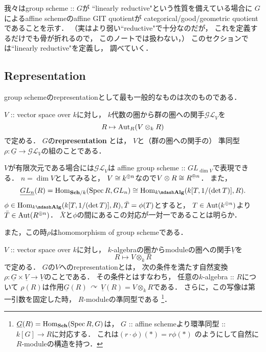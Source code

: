 \documentclass[a4paper]{jsarticle}
\newcommand{\Sch}{\mathbf{Sch}}
\newcommand{\Alg}{\mathbf{Alg}}
\newcommand{\func}[1]{\underline{#1}}
\newcommand{\ftorGL}{\mathcal{GL}}
\newcommand{\acton}{\,\curvearrowright\,}
\newcommand{\GL}{GL}
\begin{document}
    我々はgroup scheme :: $G$が
    ``linearly reductive"という性質を備えている場合に
    $G$によるaffine schemeのaffine GIT quotientが
    categorical/good/geometric quotientであることを示す．
    （実はより弱い``reductive"で十分なのだが，
    これを定義するだけでも骨が折れるので，
    このノートでは扱わない，）
    このセクションでは``linearly reductive"を定義し，
    調べていく．

    \subsection{Representation} 
    group schemeのrepresentationとして最も一般的なものは次のものである．
    \begin{Def}
        $V$ :: vector space over $k$に対し，
        $k$代数の圏から群の圏への関手$\ftorGL_V$を
        \[ R \mapsto \operatorname{Aut}_R(V \otimes_k R) \]
        で定める．
        $G$の\textbf{representation} とは，
        $V$と（群の圏への関手の）
        準同型$\rho: \func{G} \to \ftorGL_V$の組のことである．
    \end{Def}
    \begin{Remark}
        $V$が有限次元である場合には$\ftorGL_V$は
        affine group scheme :: $GL_{\dim V}$で表現できる．
        $n=\dim V$としてみると，
        $V \cong k^{\oplus n}$なので$V \otimes R \cong R^{\oplus n}$．
        また，
        \[
            \func{GL_n}(R)
            =\Hom_{\Sch/k}(\Spec R, \GL_n)
            \iso \Hom_{k\mdash\Alg}(k[T, 1/(\det T)], R).
        \]
        $\phi \in \Hom_{k\mdash\Alg}(k[T, 1/(\det T)], R), \bar{T}=\phi(T)$とすると，
        $T \in \operatorname{Aut}(k^{\oplus n})$より$\bar{T} \in \operatorname{Aut}(R^{\oplus n})$．
        $\bar{X}$と$\phi$の間にあるこの対応が一対一であることは明らか．

        また，この時$\rho$はhomomorphism of group schemeである．
    \end{Remark}

    \begin{Def}
        $V$ :: vector space over $k$に対し，
        $k$-algebraの圏からmoduleの圏への関手$\func{V}$を
        \[ R \mapsto V \otimes_k R \]
        で定める．
        $G$の$V$へのrepresentationとは，
        次の条件を満たす自然変換
        $\rho: \func{G} \times \func{V} \to \func{V}$のことである．
        その条件とはすなわち，
        任意の$k$-algebra :: $R$について
        $\rho(R)$は作用$\func{G}(R) \acton \func{V}(R)=V \otimes_k R$である．
        さらに，この写像は第一引数を固定した時，
        $R$-moduleの準同型である
        \footnote
        {
            $\func{G}(R)=\Hom_{\Sch}(\Spec R, G)$は，
            $G$ :: affine schemeより環準同型 :: $k[G] \to R$に対応する．
            これは$(r \cdot \phi)(*)=r \phi(*)$
            のようにして自然に$R$-moduleの構造を持つ．
        }．
    \end{Def}
\end{document}
